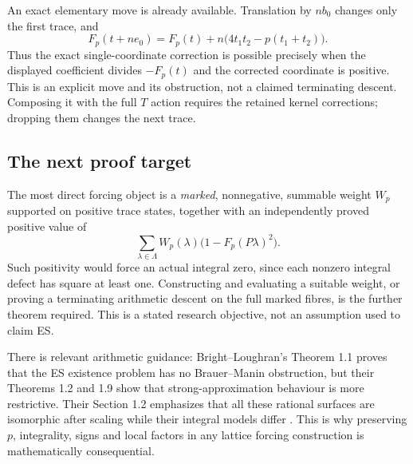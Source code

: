 \documentclass[11pt,reqno]{amsart}
\theoremstyle{definition}\newtheorem{definition}[theorem]{Definition}
\theoremstyle{remark}\newtheorem{remark}[theorem]{Remark}
\newcommand{\La}{\Lambda}\newcommand{\tr}{\operatorname{tr}}\newcommand{\Span}{\operatorname{span}}
\begin{document}
An exact elementary move is already available. Translation by $n b_0$ changes only the first trace, and
\[
F_p(t+ne_0)=F_p(t)+n\big(4t_1t_2-p(t_1+t_2)\big).
\]
Thus the exact single-coordinate correction is possible precisely when the displayed coefficient divides $-F_p(t)$ and the corrected coordinate is positive. This is an explicit move and its obstruction, not a claimed terminating descent. Composing it with the full $T$ action requires the retained kernel corrections; dropping them changes the next trace.

\subsection{The next proof target}
The most direct forcing object is a \emph{marked}, nonnegative, summable weight $W_p$ supported on positive trace states, together with an independently proved positive value of
\[
\sum_{\lambda\in\La}W_p(\lambda)\bigl(1-F_p(P\lambda)^2\bigr).
\]
Such positivity would force an actual integral zero, since each nonzero integral defect has square at least one. Constructing and evaluating a suitable weight, or proving a terminating arithmetic descent on the full marked fibres, is the further theorem required. This is a stated research objective, not an assumption used to claim ES.

There is relevant arithmetic guidance: Bright--Loughran's Theorem 1.1 proves that the ES existence problem has no Brauer--Manin obstruction, but their Theorems 1.2 and 1.9 show that strong-approximation behaviour is more restrictive. Their Section 1.2 emphasizes that all these rational surfaces are isomorphic after scaling while their integral models differ \cite{BL}. This is why preserving $p$, integrality, signs and local factors in any lattice forcing construction is mathematically consequential.

\appendix
\end{document}
